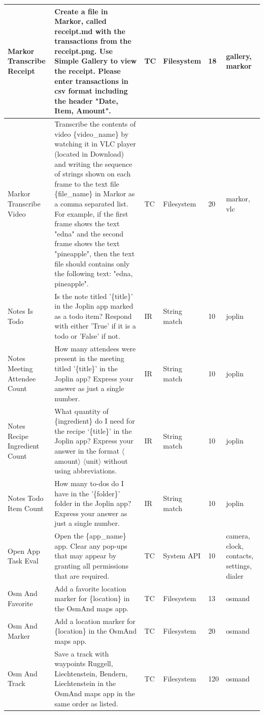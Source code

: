 \documentclass{article}
\begin{document}
\begin{appendices}
\begin{longtable}{>{\RaggedRight\seqsplit}p{.8in}p{2in}p{.3in}p{.5in}p{.3in}p{.5in}}
\midrule
Markor Transcribe Receipt & Create a file in Markor, called receipt.md with the transactions from the receipt.png. Use Simple Gallery to view the receipt. Please enter transactions in csv format including the header "Date, Item, Amount". & TC & Filesystem & 18 & gallery, markor \\
\midrule
Markor Transcribe Video & Transcribe the contents of video \{video\_name\} by watching it in VLC player (located in Download) and writing the sequence of strings shown on each frame to the text file \{file\_name\} in Markor as a comma separated list. For example, if the first frame shows the text "edna" and the second frame shows the text "pineapple", then the text file should contains only the following text: "edna, pineapple". & TC & Filesystem & 20 & markor, vlc \\
\midrule
Notes Is Todo & Is the note titled '\{title\}' in the Joplin app marked as a todo item? Respond with either 'True' if it is a todo or 'False' if not. & IR & String match & 10 & joplin \\
\midrule
Notes Meeting Attendee Count & How many attendees were present in the meeting titled '\{title\}' in the Joplin app? Express your answer as just a single number. & IR & String match & 10 & joplin \\
\midrule
Notes Recipe Ingredient Count & What quantity of \{ingredient\} do I need for the recipe `\{title\}' in the Joplin app? Express your answer in the format $\langle$amount$\rangle$ $\langle$unit$\rangle$ without using abbreviations. & IR & String match & 10 & joplin \\
\midrule
Notes Todo Item Count & How many to-dos do I have in the '\{folder\}' folder in the Joplin app? Express your answer as just a single number. & IR & String match & 10 & joplin \\
\midrule
Open App Task Eval & Open the \{app\_name\} app. Clear any pop-ups that may appear by granting all permissions that are required. & TC & System API & 10 & camera, clock, contacts, settings, dialer \\
\midrule
Osm And Favorite & Add a favorite location marker for \{location\} in the OsmAnd maps app. & TC & Filesystem & 13 & osmand \\
\midrule
Osm And Marker & Add a location marker for \{location\} in the OsmAnd maps app. & TC & Filesystem & 20 & osmand \\
\midrule
Osm And Track & Save a track with waypoints Ruggell, Liechtenstein, Bendern, Liechtenstein in the OsmAnd maps app in the same order as listed. & TC & Filesystem & 120 & osmand \\

\end{longtable}
\end{appendices}
\end{document}
